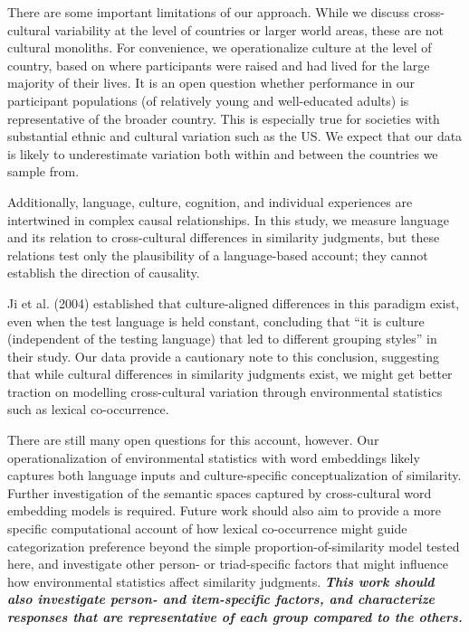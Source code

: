 \documentclass[10pt, letterpaper]{article}
\begin{document}
There are some important limitations of our approach. While we discuss
cross-cultural variability at the level of countries or larger world
areas, these are not cultural monoliths. For convenience, we
operationalize culture at the level of country, based on where
participants were raised and had lived for the large majority of their
lives. It is an open question whether performance in our participant
populations (of relatively young and well-educated adults) is
representative of the broader country. This is especially true for
societies with substantial ethnic and cultural variation such as the US.
We expect that our data is likely to underestimate variation both within
and between the countries we sample from.

Additionally, language, culture, cognition, and individual experiences
are intertwined in complex causal relationships. In this study, we
measure language and its relation to cross-cultural differences in
similarity judgments, but these relations test only the plausibility of
a language-based account; they cannot establish the direction of
causality.

Ji et al. (2004) established that culture-aligned differences in this
paradigm exist, even when the test language is held constant, concluding
that ``it is culture (independent of the testing language) that led to
different grouping styles'' in their study. Our data provide a
cautionary note to this conclusion, suggesting that while cultural
differences in similarity judgments exist, we might get better traction
on modelling cross-cultural variation through environmental statistics
such as lexical co-occurrence.

There are still many open questions for this account, however. Our
operationalization of environmental statistics with word embeddings
likely captures both language inputs and culture-specific
conceptualization of similarity. Further investigation of the semantic
spaces captured by cross-cultural word embedding models is required.
Future work should also aim to provide a more specific computational
account of how lexical co-occurrence might guide categorization
preference beyond the simple proportion-of-similarity model tested here,
and investigate other person- or triad-specific factors that might
influence how environmental statistics affect similarity judgments.
\textbf{\emph{This work should also investigate person- and
item-specific factors, and characterize responses that are
representative of each group compared to the others.}}
\end{document}
